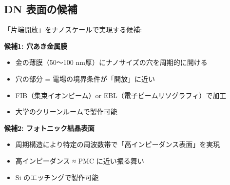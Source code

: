 \documentclass[12pt,a4paper]{article}
\begin{document}
\subsection{DN 表面の候補}
\begin{expbox}[ノイマン条件をナノで作る]
「片端開放」をナノスケールで実現する候補:

\textbf{候補1: 穴あき金属膜}
\begin{itemize}
\item 金の薄膜（50〜100 nm厚）にナノサイズの穴を周期的に開ける
\item 穴の部分 = 電場の境界条件が「開放」に近い
\item FIB（集束イオンビーム）or EBL（電子ビームリソグラフィ）で加工
\item 大学のクリーンルームで製作可能
\end{itemize}

\textbf{候補2: フォトニック結晶表面}
\begin{itemize}
\item 周期構造により特定の周波数帯で「高インピーダンス表面」を実現
\item 高インピーダンス ≈ PMC に近い振る舞い
\item Si のエッチングで製作可能
\end{itemize}
\end{expbox}
\end{document}
